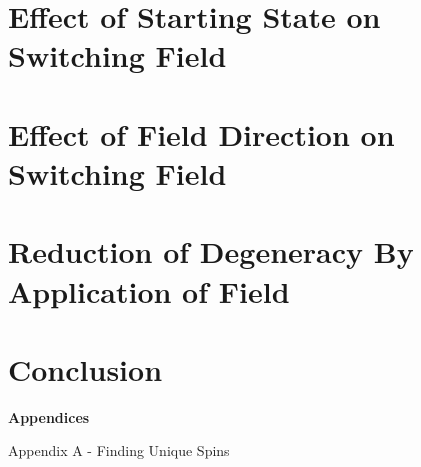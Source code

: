 \documentclass{article}
\begin{document}
\section{Effect of Starting State on Switching Field}

\section{Effect of Field Direction on Switching Field}

\section{Reduction of Degeneracy By Application of Field}

\section{Conclusion}


\begin{center}
\LARGE\textbf{Appendices} \\
\end{center}
\Large
Appendix A - Finding Unique Spins
\large
\end{document}
